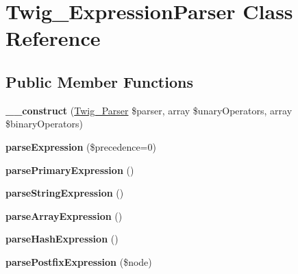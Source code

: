 \hypertarget{class_twig___expression_parser}{}\section{Twig\+\_\+\+Expression\+Parser Class Reference}
\label{class_twig___expression_parser}
\subsection*{Public Member Functions}
\begin{DoxyCompactItemize}
\item 
\hypertarget{class_twig___expression_parser_ab976f2623fcf3bfe631ecfed19139d61}{}{\bfseries \+\_\+\+\_\+construct} (\hyperlink{class_twig___parser}{Twig\+\_\+\+Parser} \$parser, array \$unary\+Operators, array \$binary\+Operators)\label{class_twig___expression_parser_ab976f2623fcf3bfe631ecfed19139d61}

\item 
\hypertarget{class_twig___expression_parser_a7071b8b73762e33627251e6515b0fe20}{}{\bfseries parse\+Expression} (\$precedence=0)\label{class_twig___expression_parser_a7071b8b73762e33627251e6515b0fe20}

\item 
\hypertarget{class_twig___expression_parser_af4649c23ab84785567030a0673a9ee76}{}{\bfseries parse\+Primary\+Expression} ()\label{class_twig___expression_parser_af4649c23ab84785567030a0673a9ee76}

\item 
\hypertarget{class_twig___expression_parser_a99a1301121a1b6e34fb7ce044baef1cf}{}{\bfseries parse\+String\+Expression} ()\label{class_twig___expression_parser_a99a1301121a1b6e34fb7ce044baef1cf}

\item 
\hypertarget{class_twig___expression_parser_ac8125f8f7746662e24757a1207fe9986}{}{\bfseries parse\+Array\+Expression} ()\label{class_twig___expression_parser_ac8125f8f7746662e24757a1207fe9986}

\item 
\hypertarget{class_twig___expression_parser_aa1ab124f21f6eb72bdda3f835a747237}{}{\bfseries parse\+Hash\+Expression} ()\label{class_twig___expression_parser_aa1ab124f21f6eb72bdda3f835a747237}

\item 
\hypertarget{class_twig___expression_parser_ad6aaf1c175652606d37f74ef5e008664}{}{\bfseries parse\+Postfix\+Expression} (\$node)\label{class_twig___expression_parser_ad6aaf1c175652606d37f74ef5e008664}


\end{DoxyCompactItemize}
